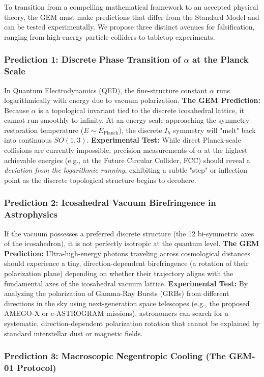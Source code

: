 To transition from a compelling mathematical framework to an accepted physical theory, the GEM must make predictions that differ from the Standard Model and can be tested experimentally. We propose three distinct avenues for falsification, ranging from high-energy particle colliders to tabletop experiments.

\subsubsection{Prediction 1: Discrete Phase Transition of $\alpha$ at the Planck Scale}
In Quantum Electrodynamics (QED), the fine-structure constant $\alpha$ runs logarithmically with energy due to vacuum polarization. 
\textbf{The GEM Prediction:} Because $\alpha$ is a topological invariant tied to the discrete icosahedral lattice, it cannot run smoothly to infinity. At an energy scale approaching the symmetry restoration temperature ($E \sim E_{\text{Planck}}$), the discrete $I_h$ symmetry will "melt" back into continuous $SO(1,3)$. 
\textbf{Experimental Test:} While direct Planck-scale collisions are currently impossible, precision measurements of $\alpha$ at the highest achievable energies (e.g., at the Future Circular Collider, FCC) should reveal a \textit{deviation from the logarithmic running}, exhibiting a subtle "step" or inflection point as the discrete topological structure begins to decohere.

\subsubsection{Prediction 2: Icosahedral Vacuum Birefringence in Astrophysics}
If the vacuum possesses a preferred discrete structure (the 12 bi-symmetric axes of the icosahedron), it is not perfectly isotropic at the quantum level. 
\textbf{The GEM Prediction:} Ultra-high-energy photons traveling across cosmological distances should experience a tiny, direction-dependent birefringence (a rotation of their polarization plane) depending on whether their trajectory aligns with the fundamental axes of the icosahedral vacuum lattice.
\textbf{Experimental Test:} By analyzing the polarization of Gamma-Ray Bursts (GRBs) from different directions in the sky using next-generation space telescopes (e.g., the proposed AMEGO-X or e-ASTROGRAM missions), astronomers can search for a systematic, direction-dependent polarization rotation that cannot be explained by standard interstellar dust or magnetic fields.

\subsubsection{Prediction 3: Macroscopic Negentropic Cooling (The GEM-01 Protocol)}

